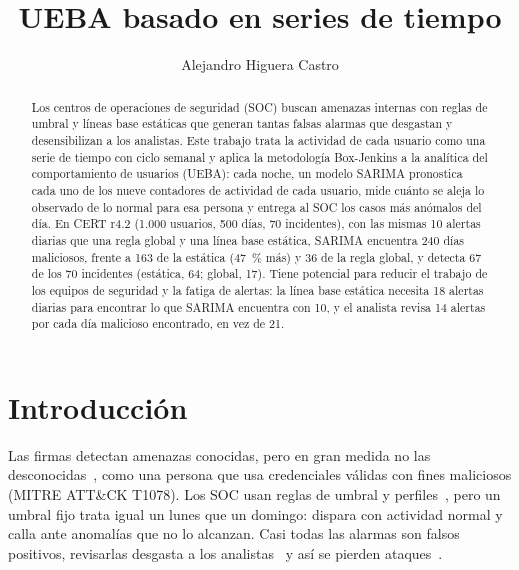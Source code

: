 \documentclass[runningheads,a4paper]{llncs}
\begin{document}
\title{\texorpdfstring{\\ UEBA basado en series de tiempo}{Detectando lo que las reglas y las líneas base no ven: UEBA basado en series de tiempo}}
\author{Alejandro Higuera Castro}

\maketitle

\begin{abstract}
Los centros de operaciones de seguridad (SOC) buscan amenazas internas con reglas de umbral y líneas base estáticas que generan tantas falsas alarmas que desgastan y desensibilizan a los analistas. Este trabajo trata la actividad de cada usuario como una serie de tiempo con ciclo semanal y aplica la metodología Box-Jenkins a la analítica del comportamiento de usuarios (UEBA): cada noche, un modelo SARIMA pronostica cada uno de los nueve contadores de actividad de cada usuario, mide cuánto se aleja lo observado de lo normal para esa persona y entrega al SOC los casos más anómalos del día. En CERT r4.2 (1.000 usuarios, 500 días, 70 incidentes), con las mismas 10 alertas diarias que una regla global y una línea base estática, SARIMA encuentra 240 días maliciosos, frente a 163 de la estática (47~\% más) y 36 de la regla global, y detecta 67 de los 70 incidentes (estática, 64; global, 17). Tiene potencial para reducir el trabajo de los equipos de seguridad y la fatiga de alertas: la línea base estática necesita 18 alertas diarias para encontrar lo que SARIMA encuentra con 10, y el analista revisa 14 alertas por cada día malicioso encontrado, en vez de 21.
\end{abstract}

\section{Introducción}

Las firmas detectan amenazas conocidas, pero en gran medida no las desconocidas~\cite{nist80094}, como una persona que usa credenciales válidas con fines maliciosos (MITRE ATT\&CK T1078). Los SOC usan reglas de umbral y perfiles~\cite{nist80094}, pero un umbral fijo trata igual un lunes que un domingo: dispara con actividad normal y calla ante anomalías que no lo alcanzan. Casi todas las alarmas son falsos positivos, revisarlas desgasta a los analistas~\cite{alahmadi2022} y así se pierden ataques~\cite{hassan2019nodoze}.
\end{document}
